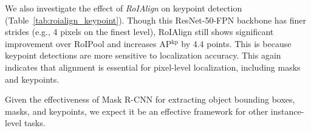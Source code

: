 We also investigate the effect of \emph{RoIAlign} on keypoint detection (Table~\ref{tab:roialign_keypoint}).  Though this ResNet-50-FPN backbone has finer strides (e.g., 4 pixels on the finest level), RoIAlign still shows significant improvement over RoIPool and increases AP$^\text{kp}$ by 4.4 points. This is because keypoint detections are more sensitive to localization accuracy. This again indicates that alignment is essential for pixel-level localization, including masks and keypoints.

Given the effectiveness of Mask R-CNN for extracting object bounding boxes, masks, and keypoints, we expect it be an effective framework for other instance-level tasks.